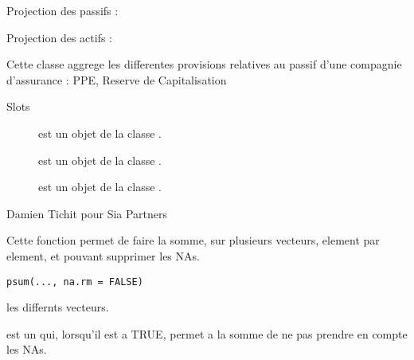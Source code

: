 \documentclass[a4paper]{book}
\begin{document}
%
\begin{SeeAlso}\relax
Projection des passifs : 

Projection des actifs : 
\end{SeeAlso}
%
\begin{Description}\relax
Cette classe aggrege les differentes provisions relatives au passif d'une compagnie d'assurance : PPE, Reserve de Capitalisation
\end{Description}
%
\begin{Section}{Slots}

\begin{description}

\item[] est un objet de la classe .

\item[] est un objet de la classe .

\item[] est un objet de la classe .

\end{description}
\end{Section}
%
\begin{Author}\relax
Damien Tichit pour Sia Partners
\end{Author}
%
\begin{Description}\relax
Cette fonction permet de faire la somme, sur plusieurs vecteurs, element par element, et pouvant supprimer les NAs.
\end{Description}
%
\begin{Usage}
\begin{verbatim}
psum(..., na.rm = FALSE)
\end{verbatim}
\end{Usage}
%
\begin{Arguments}
\begin{ldescription}
\item[\code{...}] les differnts vecteurs.

\item[\code{na.rm}] est un  qui, lorsqu'il est a TRUE, permet a la somme de ne pas prendre en compte les NAs.
\end{ldescription}
\end{Arguments}
\end{document}
